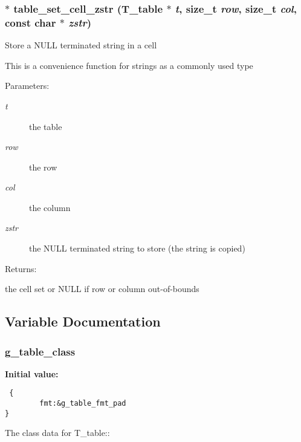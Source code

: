\subsubsection{$\ast$ table\_\-set\_\-cell\_\-zstr ({\bf T\_\-table} $\ast$ {\em t}, size\_\-t {\em row}, size\_\-t {\em col}, const char $\ast$ {\em zstr})}\label{group__simple__table_a8}


Store a NULL terminated string in a cell

This is a convenience function for strings as a commonly used type\begin{Desc}
\item[Parameters: ]\par
\begin{description}
\item[{\em 
t}]the table \item[{\em 
row}]the row \item[{\em 
col}]the column \item[{\em 
zstr}]the NULL terminated string to store (the string is copied)\end{description}
\end{Desc}
\begin{Desc}
\item[Returns: ]\par
the cell set or NULL if row or column out-of-bounds \end{Desc}


\subsection{Variable Documentation}
\subsubsection{ g\_\-table\_\-class}\label{group__simple__table_a3}


{\bf Initial value:}

\footnotesize\begin{verbatim} {
        fmt:&g_table_fmt_pad
}\end{verbatim}\normalsize 
The class data for T\_\-table:: 
